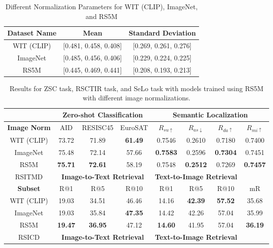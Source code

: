 \documentclass[journal]{IEEEtran}
\begin{document}
\begin{table}[ht]
\caption{Different Normalization Parameters for WIT (CLIP), ImageNet, and RS5M}
\label{table:norm_param}
\centering
\begin{tabular}{|c|c|c|}
\toprule
Dataset Name & Mean & Standard Deviation \\
\midrule
WIT (CLIP) &[0.481, 0.458, 0.408]	& [0.269, 0.261, 0.276] \\
\midrule
ImageNet & [0.485, 0.456, 0.406]	& [0.229, 0.224, 0.225] \\
\midrule
RS5M  & [0.445, 0.469, 0.441]	& [0.208, 0.193, 0.213] \\
\bottomrule
\end{tabular}
\end{table}

\begin{table}[ht]
\caption{Results for ZSC task, RSCTIR task, and SeLo task with models trained using RS5M with different image normalizations.}
\label{table:imagenorm}
\footnotesize
\setlength{\tabcolsep}{1.75pt}
\begin{tabular}{cccccccc}
\toprule
& \multicolumn{3}{c}{\textbf{Zero-shot Classification}} & \multicolumn{4}{c}{\textbf{Semantic Localization}} \\
\midrule
\textbf{Image Norm} & AID & RESISC45 & EuroSAT & $R_{su\uparrow}$ & $R_{as\downarrow}$ & $R_{da\uparrow}$ & $R_{mi\uparrow}$ \\
\midrule
 WIT (CLIP) & 73.72 & 71.89 & \textbf{61.49} & 0.7546 & 0.2610 &0.7180 &0.7400 \\
 ImageNet &75.48&72.14&57.66	&\textbf{0.7583} & 0.2596	&\textbf{0.7304}		&0.7451\\
 RS5M &\textbf{75.71}&\textbf{72.61}&58.19 &0.7548&\textbf{0.2512}&0.7269&\textbf{0.7457} \\
\midrule
\midrule
RSITMD & \multicolumn{3}{c}{\textbf{Image-to-Text Retrieval}} & \multicolumn{3}{c}{\textbf{Text-to-Image Retrieval}} & \\
\midrule
\textbf{Subset} &  {R@1} & {R@5} & {R@10} & {R@1} & {R@5} & {R@10} & {mR} \\
 \midrule
  WIT (CLIP) & 19.03 & 	34.51 & 	46.46	 & 14.16	&  \textbf{42.39} & 	\textbf{57.52}  & 	35.68\\
 ImageNet &19.03	&35.84	&\textbf{47.35}	&14.42	&42.26	&57.04	&35.99	\\
 RS5M &\textbf{19.47}	&\textbf{36.95}	&47.12	&\textbf{14.60}	&41.95	&57.04	&\textbf{36.19} \\
\midrule
RSICD & \multicolumn{3}{c}{\textbf{Image-to-Text Retrieval}} & \multicolumn{3}{c}{\textbf{Text-to-Image Retrieval}} & \\

\end{tabular}
\end{table}
\end{document}
